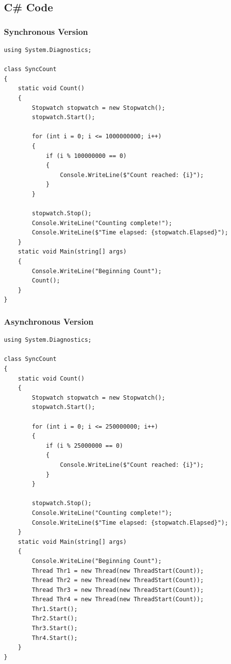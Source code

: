 \documentclass[12pt,a4paper]{article}
\begin{document}
\subsection{C\# Code}

\subsubsection{Synchronous Version}
\begin{verbatim}
using System.Diagnostics;

class SyncCount
{
    static void Count()
    {
        Stopwatch stopwatch = new Stopwatch();
        stopwatch.Start();

        for (int i = 0; i <= 1000000000; i++)
        {
            if (i % 100000000 == 0)
            {
                Console.WriteLine($"Count reached: {i}");
            }
        }

        stopwatch.Stop();
        Console.WriteLine("Counting complete!");
        Console.WriteLine($"Time elapsed: {stopwatch.Elapsed}");
    }
    static void Main(string[] args)
    {
        Console.WriteLine("Beginning Count");
        Count();
    }
}
\end{verbatim}

\subsubsection{Asynchronous Version}
\begin{verbatim}
using System.Diagnostics;

class SyncCount
{
    static void Count()
    {
        Stopwatch stopwatch = new Stopwatch();
        stopwatch.Start();

        for (int i = 0; i <= 250000000; i++)
        {
            if (i % 25000000 == 0)
            {
                Console.WriteLine($"Count reached: {i}");
            }
        }

        stopwatch.Stop();
        Console.WriteLine("Counting complete!");
        Console.WriteLine($"Time elapsed: {stopwatch.Elapsed}");
    }
    static void Main(string[] args)
    {
        Console.WriteLine("Beginning Count");
        Thread Thr1 = new Thread(new ThreadStart(Count));
        Thread Thr2 = new Thread(new ThreadStart(Count));
        Thread Thr3 = new Thread(new ThreadStart(Count));
        Thread Thr4 = new Thread(new ThreadStart(Count));
        Thr1.Start();
        Thr2.Start();
        Thr3.Start();
        Thr4.Start();
    }
}
\end{verbatim}
\end{document}
